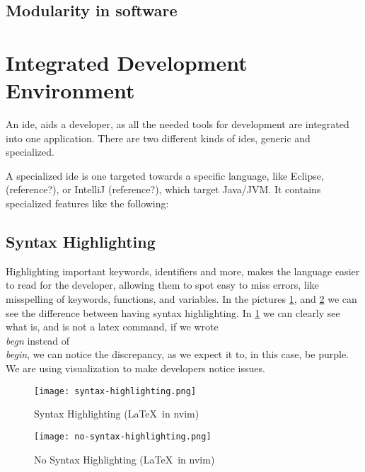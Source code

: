 \subsection{Modularity in software}


\section{Integrated Development Environment} \label{sec:ide}

An \gls{ide}, aids a developer, as all the needed tools for development are
integrated into one application. There are two different kinds of \gls{ide}s,
generic and specialized.

A specialized \gls{ide} is one targeted towards a specific language, like
Eclipse, (reference?), or IntelliJ (reference?), which target Java/JVM. It
contains specialized features like the following:

\subsection{Syntax Highlighting}

Highlighting important keywords, identifiers and more, makes the language easier
to read for the developer, allowing them to spot easy to miss errors, like
misspelling of keywords, functions, and variables. In the pictures
\ref{pic:stx}, and \ref{pic:noStx} we can see the difference between having
syntax highlighting. In \ref{pic:stx} we can clearly see what is, and is not a
latex command, if we wrote \textit{\\begn} instead of \textit{\\begin}, we can
notice the discrepancy, as we expect it to, in this case, be purple. We are
using visualization to make developers notice issues.

\begin{figure} \label{pic:stx}
  \centering
  \texttt{[image: syntax-highlighting.png]}
  \caption{Syntax Highlighting (\LaTeX\ in \gls{nvim})}
\end{figure}

\begin{figure} \label{pic:noStx}
  \centering
  \texttt{[image: no-syntax-highlighting.png]}
  \caption{No Syntax Highlighting (\LaTeX\ in \gls{nvim})}
\end{figure}

